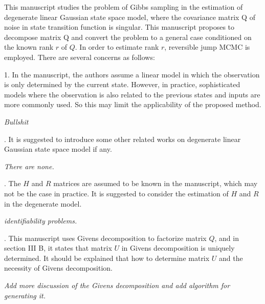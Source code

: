 \documentclass{article}
\newenvironment{review}[0]{\begin{itshape}\color{Gray}\noindent}{\end{itshape}\vspace{0.4cm}}
\newenvironment{response}[0]{\noindent}{\vspace{0.4cm}}
\newcommand{\meta}[1]{{\color{red}\em #1}}
\begin{document}
\begin{review}
This manuscript studies the problem of Gibbs sampling in the estimation of degenerate linear Gaussian state space model, where the covariance matrix Q of noise in state transition function is singular. This manuscript proposes to decompose matrix Q and convert the problem to a general case conditioned on the known rank $r$ of $Q$. In order to estimate rank $r$, reversible jump MCMC is employed. There are several concerns as follows:

1.  In the manuscript, the authors assume a linear model in which the observation is only determined by the current state. However, in practice, sophisticated models where the observation is also related to the previous states and inputs are more commonly used. So this may limit the applicability of the proposed method.
\end{review}

\begin{response}
 \meta{Bullshit}
\end{response}

\begin{review}
2.  It is suggested to introduce some other related works on degenerate linear Gaussian state space model if any.
\end{review}

\begin{response}
 \meta{There are none.}
\end{response}

\begin{review}
3.  The $H$ and $R$ matrices are assumed to be known in the manuscript, which may not be the case in practice. It is suggested to consider the estimation of $H$ and $R$ in the degenerate model.
\end{review}

\begin{response}
 \meta{identifiability problems.}
\end{response}

\begin{review}
4.  This manuscript uses Givens decomposition to factorize matrix $Q$, and in section III B, it states that matrix $U$ in Givens decomposition is uniquely determined. It should be explained that how to determine matrix $U$ and the necessity of Givens decomposition.
\end{review}

\begin{response}
 \meta{Add more discussion of the Givens decomposition and add algorithm for generating it.}
\end{response}
\end{document}
